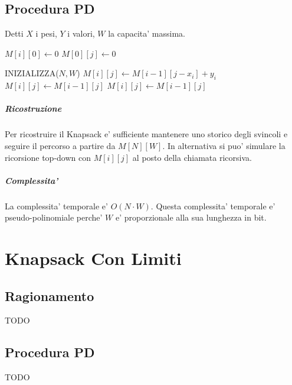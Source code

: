 \newpage

\section{Procedura PD}

Detti $X$ i pesi, $Y$ i valori, $W$ la capacita' massima.

\begin{algorithm}
    \begin{algorithmic}
                \State $M[i][0] \gets 0$
            \EndFor
                \State $M[0][j] \gets 0$
            \EndFor
        \EndProcedure
    \end{algorithmic}
\end{algorithm}

\begin{algorithm}
    \begin{algorithmic}
            \State INIZIALIZZA($N, W$)
                            \State $M[i][j] \gets M[i - 1][j - x_i] + y_i$
                        \Else
                            \State $M[i][j] \gets M[i - 1][j]$
                        \EndIf
                    \Else
                        \State $M[i][j] \gets M[i - 1][j]$
                    \EndIf
                \EndFor
            \EndFor
        \EndProcedure
    \end{algorithmic}
\end{algorithm}

\paragraph{Ricostruzione}

Per ricostruire il Knapsack e' sufficiente mantenere uno storico degli svincoli e seguire il percorso a partire da $M[N][W]$.
In alternativa si puo' simulare la ricorsione top-down con $M[i][j]$ al posto della chiamata ricorsiva.

\paragraph{Complessita'}

La complessita' temporale e' $O(N \cdot W)$.
Questa complessita' temporale e' pseudo-polinomiale perche' $W$ e' proporzionale alla sua lunghezza in bit.

\chapter{Knapsack Con Limiti}

\section{Ragionamento}

TODO

\section{Procedura PD}

TODO